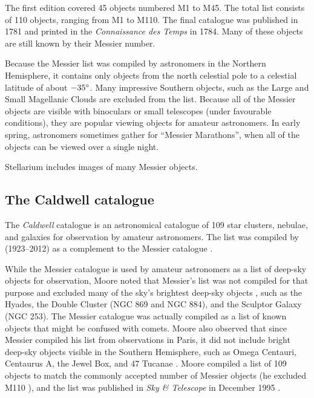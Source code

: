 The first edition covered 45 objects numbered M1 to M45. The total list
consists of 110 objects, ranging from M1 to M110. The final catalogue
was published in 1781 and printed in the \emph{Connaissance des Temps}
in 1784. Many of these objects are still known by their Messier number.

Because the Messier list was compiled by astronomers in the Northern
Hemisphere, it contains only objects from the north celestial pole to a
celestial latitude of about $-35\degree$. Many impressive Southern objects, such
as the Large  and Small  
Magellanic Clouds are excluded from the list.
Because all of the Messier objects are visible with binoculars or small
telescopes (under favourable conditions), they are popular viewing
objects for amateur astronomers. In early spring, astronomers sometimes
gather for ``Messier Marathons'', when all of the objects can be viewed
over a single night.

Stellarium includes images of many Messier objects.

%
%
\subsection{The Caldwell catalogue}
\label{sec:Phenomena:Caldwell}

The \emph{Caldwell} catalogue is an astronomical catalogue of 109 star
clusters, nebulae, and galaxies for observation by amateur
astronomers. The list was compiled by 
(1923--2012) as a complement to the Messier catalogue
\citep{SJOMeara:2003}.

While the Messier catalogue is used by amateur astronomers as a list
of deep-sky objects for observation, Moore noted that Messier's list
was not compiled for that purpose and excluded many of the sky's
brightest deep-sky objects \citep{SJOMeara:2003}, such as the Hyades,
the Double Cluster (NGC 869 and NGC 884), and the Sculptor Galaxy (NGC
253). The Messier catalogue was actually compiled as a list of known
objects that might be confused with comets. Moore also observed that
since Messier compiled his list from observations in Paris, it did not
include bright deep-sky objects visible in the Southern Hemisphere,
such as Omega Centauri, Centaurus A, the Jewel Box, and 47 Tucanae
\citep{SJOMeara:2003}. Moore compiled a list of 109 objects to match
the commonly accepted number of Messier objects (he excluded M110
\citep{Moore:1995}), and the list was published in \emph{Sky \&
  Telescope} in December 1995 \citep{Moore:1995}.

